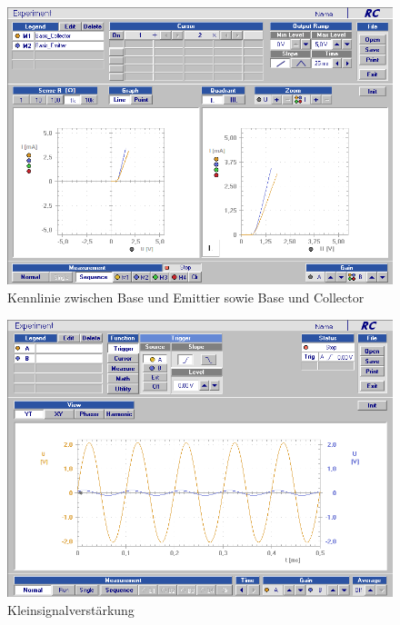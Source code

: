 \documentclass[12pt,a4paper]{article}
\begin{document}
\begin{figure}[H]
	\centering
	\includegraphics[scale=0.5]{./data/Braun_Kurz_PS8/Kennlinien_Emitter_Collector.png}
	\caption{Kennlinie zwischen Base und Emittier sowie Base und Collector}
	\label{fig:kenn_emit_coll}
\end{figure}

\begin{figure}[H]
	\centering
	\includegraphics[scale=0.5]{./data/Braun_Kurz_PS8/Kleinsignalverstaerkung.png}
	\caption{Kleinsignalverstärkung}
	\label{fig:kleinsignalverstaerkung}
\end{figure}
\end{document}
